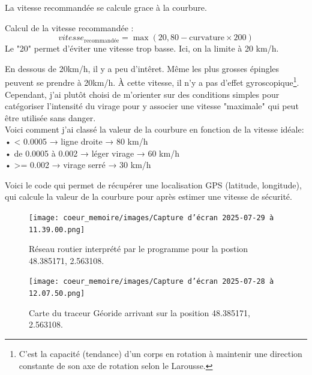 
La vitesse recommandée se calcule grace à la courbure.
\begin{tcolorbox}[title=Vitesse recommandée]
Calcul de la vitesse recommandée :
\[
vitesse_{\text{recommandée}} = \max(20, 80-\text{curvature} \times 200)
\]
Le "20" permet d'éviter une vitesse trop basse. Ici, on la limite à 20 km/h.

\end{tcolorbox}

En dessous de 20km/h, il y a peu d'intêret. Même les plus grosses épingles peuvent se prendre à 20km/h. À cette vitesse, il n'y a pas d'effet gyroscopique\footnote{C'est la capacité (tendance) d'un corps en rotation à maintenir une direction constante de son axe de rotation selon le Larousse.}.
Cependant, j'ai plutôt choisi de m'orienter sur des conditions simples pour catégoriser l'intensité du virage pour y associer une vitesse "maximale" qui peut être utilisée sans danger.\\
Voici comment j'ai classé la valeur de la courbure en fonction de la vitesse idéale: \\
•	< 0.0005 → ligne droite → 80 km/h \\
•	de 0.0005 à 0.002 → léger virage → 60 km/h\\
•	>= 0.002 → virage serré → 30 km/h


\vspace{0.5cm}
Voici le code qui permet de récupérer une localisation GPS (latitude, longitude), qui calcule la valeur de la courbure pour après estimer une vitesse de sécurité.


\begin{figure}[H]
    \centering
    \texttt{[image: coeur\_memoire/images/Capture d’écran 2025-07-29 à 11.39.00.png]} 
    \caption{Réseau routier interprété par le programme pour la postion 48.385171, 2.563108.}
\end{figure}

\begin{figure}[H]
    \centering
    \texttt{[image: coeur\_memoire/images/Capture d’écran 2025-07-28 à 12.07.50.png]} 
    \caption{Carte du traceur Géoride arrivant sur la position 48.385171, 2.563108.}
\end{figure}



